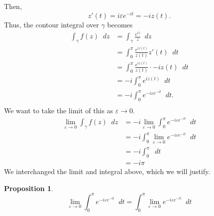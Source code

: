 \documentclass[a4paper]{article}
\newcommand*\diff{\mathop{}\!d} %
\newtheorem{proposition}[theorem]{Proposition}
\theoremstyle{definition}
\begin{document}
Then,
\begin{equation*}
    z'(t) = i \varepsilon e^{-it} = -i z(t).
\end{equation*}
Thus, the contour integral over $\gamma$ becomes
\begin{align*}
    \int_{\gamma} f(z) \diff z & = \int_{\gamma} \frac{e^{iz}}{z} \diff z                     \\
                               & = \int_{0}^{\pi} \frac{e^{iz(t)}}{z(t)} z'(t) \diff t        \\
                               & = \int_{0}^{\pi} \frac{e^{iz(t)}}{z(t)} \cdot -iz(t) \diff t \\
                               & = -i \int_{0}^{\pi} e^{iz(t)} \diff t                        \\
                               & = -i \int_{0}^{\pi} e^{-i\varepsilon e^{-it}} \diff t.       \\
\end{align*}
We want to take the limit of this as $\varepsilon \to 0$.
\begin{align*}
    \lim_{\varepsilon \to 0} \int_{\gamma} f(z) \diff z & = -i \lim_{\varepsilon \to 0} \int_{0}^{\pi} e^{-i\varepsilon e^{-it}} \diff t \\
                                                        & = -i \int_{0}^{\pi} \lim_{\varepsilon \to 0} e^{-i\varepsilon e^{-it}} \diff t \\
                                                        & = -i \int_{0}^{\pi} \diff t                                                    \\
                                                        & = -i \pi
\end{align*}
We interchanged the limit and integral above, which we will justify.
\begin{proposition}
    \begin{equation*}
        \lim_{\varepsilon \to 0} \int_{0}^{\pi} e^{-i\varepsilon e^{-it}} \diff t = \int_{0}^{\pi} \lim_{\varepsilon \to 0} e^{-i\varepsilon e^{-it}} \diff t
    \end{equation*}
\end{proposition}
\end{document}
